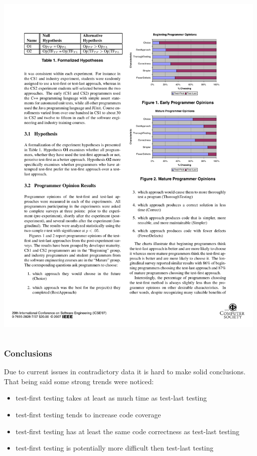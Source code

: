 \documentclass{beamer}
\newcommand{\linespace}{\vskip 0.25cm}
\begin{document}
\begin{frame}
\begin{columns}
\begin{column}{.5\textwidth}
\includegraphics[scale=.75]{janzengraph2.pdf}
\\
\end{column}
\end{columns}
\end{frame}

\begin{frame}
\frametitle{Conclusions}
Due to current issues in contradictory data it is hard to make solid conclusions.
\linespace
That being said some strong trends were noticed:
\begin{itemize}
\item  test-first testing takes at least as much time as test-last testing
\item test-first testing tends to increase code coverage
\item test-first testing has at least the same code correctness as test-last testing
\item test-first testing is potentially more difficult then test-last testing
\end{itemize}
\end{frame}
\end{document}
